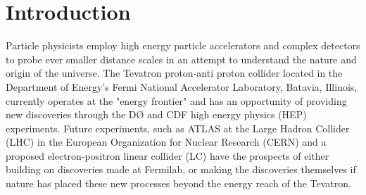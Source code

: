 \documentclass{revtex4}
\newcommand{\DO}{\mbox{D\O}}
\begin{document}
\begin{abstract}
The \DO\ experiment at Fermilab's Tevatron will record several petabytes of data over the next five years in pursuing the goals of understanding nature and searching for the origin of mass. Computing resources required to analyze these data far exceed capabilities of any one institution. Moreover, the widely scattered geographical distribution of \DO\ collaborators poses further serious difficulties for optimal use of human and computing resources. These difficulties will exacerbate in future high energy physics experiments, like the LHC. The computing grid has long been recognized as a solution to these problems. This technology is being made a more immediate reality to end users in \DO\ by developing a grid in the \DO\ Southern Analysis Region (\DO SAR), \DO SAR-Grid, using all available resources within it and a home-grown local task manager, McFarm. We will present the architecture in which the \DO SAR-Grid is implemented, the use of technology and the functionality of the grid, and the experience from operating the grid in simulation, reprocessing and data analyses for a currently running HEP experiment.

\end{abstract}
\maketitle


\section{Introduction}

Particle physicists employ high energy particle accelerators and complex detectors to probe ever smaller distance scales in an attempt to understand the nature and origin of the universe.  The Tevatron proton-anti proton collider located in the Department of Energy's Fermi National Accelerator Laboratory,\cite{fnal} Batavia, Illinois, currently operates at the "energy frontier" and has an opportunity of providing new discoveries through the \DO\cite{d0} and CDF\cite{cdf} high energy physics (HEP) experiments. Future experiments, such as ATLAS\cite{atlas} at the Large Hadron Collider (LHC)\cite{lhc} in the European Organization for Nuclear Research (CERN)\cite{cern} and a proposed electron-positron linear collider (LC)\cite{lc} have the prospects of either building on discoveries made at Fermilab, or making the discoveries themselves if nature has placed these new processes beyond the energy reach of the Tevatron.
\end{document}
